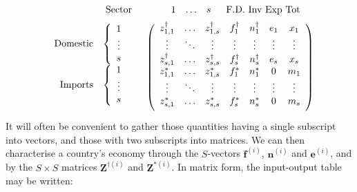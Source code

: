 \documentclass[a4paper]{article}
\begin{document}
\begin{equation}\label{eqn:T}
\begin{array}{rc}
\begin{array}{cc} & \mbox{Sector} \end{array} 
& 
\begin{array}{cccc} \hspace*{4mm}1 & \mathellipsis & s & \hspace*{2mm} \mbox{F.D. Inv Exp Tot} \end{array} \vspace*{2mm} \\
\begin{array}{r}
\begin{array}{rc}
\mbox{Domestic} & \left\{ \begin{array}{c}
1 \\
\vdots \\
s
\end{array} \right. \\
\mbox{Imports} & \left\{ \begin{array}{c}
1 \\
\vdots \\
s \\
\end{array} \right.
\end{array} \vspace*{2mm} \\
\end{array} &
\left( \begin{array}{ccccccc}
z^{\dag}_{1,1} & \mathellipsis & z^{\dag}_{1,s} & f^\dag_{1} & n^\dag_{1} & e_{1} & x_1 \\
\vdots & \ddots & \vdots & \vdots & \vdots & \vdots & \vdots \\
z^{\dag}_{s,1} & \mathellipsis & z^{\dag}_{s,s} & f^\dag_{s} & n^\dag_{s} & e_{s} & x_{s} \\
z^*_{1,1} & \mathellipsis & z^*_{1,s} & f^*_{1} & n^*_{1} & 0 & m_1 \\
\vdots & \ddots & \vdots & \vdots & \vdots & \vdots & \vdots \\
z^*_{s,1} & \mathellipsis & z^*_{s,s} & f^*_{s} & n^*_{s} & 0 & m_{s} \vspace*{2mm} \\
\end{array} \right)
\end{array}
\end{equation}
It will often be convenient to gather those quantities having a single subscript into vectors, and those with two subscripts into matrices. 
We can then characterise a country's economy through the $S$-vectors $\boldsymbol{f}^{(i)}$, $\boldsymbol{n}^{(i)}$ and $\boldsymbol{e}^{(i)}$, and by the $S\times S$ matrices $\boldsymbol{Z}^{\dagger(i)}$ and $\boldsymbol{Z}^{*(i)}$.
In matrix form, the input-output table may be written:
\end{document}
